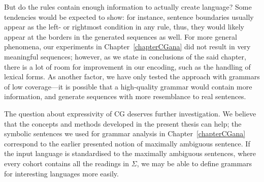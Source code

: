 But do the rules contain enough information to actually create language? 
Some tendencies would be expected to show: for instance, sentence boundaries usually appear 
as the left- or rightmost condition in any rule, thus, they would likely appear at the borders in the generated sequences as well.
For more general phenomena, our experiments in Chapter~\ref{chapterCGana} 
did not result in very meaningful sequences; 
however, as we state in conclusions of the said chapter, there is a lot of room for improvement in our encoding, such as the handling of lexical forms.
As another factor, we have only tested the approach with grammars of low coverage---it is possible that a high-quality grammar would contain more information, and generate sequences with more resemblance to real sentences.



The question about expressivity of CG deserves further investigation. 
We believe that the concepts and methods developed in the present thesis can help;
the symbolic sentences we used for grammar analysis in Chapter~\ref{chapterCGana} 
correspond to the earlier presented notion of maximally ambiguous sentence. 
If the input language is standardised to the maximally ambiguous sentences, 
where every cohort contains all the readings in $\Sigma$, 
we may be able to define grammars for interesting languages more easily. 





